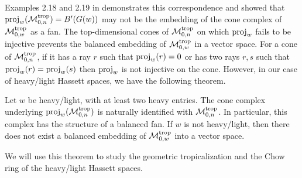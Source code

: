         Examples 2.18 and 2.19 in \citet{Cavalieri2014} demonstrates this correspondence and showed that $\operatorname{proj}_w(\mathcal{M}_{0, n}^{\operatorname{trop}}) = B'(G(w))$ 
        may not be the embedding of the cone complex of $\mathcal{M}_{0, w}^{\operatorname{trop}}$ as a fan. 
        The top-dimensional cones of $\mathcal{M}_{0, n}^{\operatorname{trop}}$ on which $\operatorname{proj}_w$ fails to be injective prevents the balanced embedding of $\mathcal{M}_{0, w}^{\operatorname{trop}}$ in a vector space. 
        For a cone of $\mathcal{M}_{0, n}^{\operatorname{trop}}$,
        if it has a ray $r$ such that $\operatorname{proj}_w(r) = 0$ or has two rays $r, s$ such that $\operatorname{proj}_w(r) = \operatorname{proj}_w(s)$ then $\operatorname{proj}_w$ is not injective on the cone. 
        However, in our case of heavy/light Hassett spaces, we have the following theorem. 
        \begin{theorem}
            Let $w$ be heavy/light, 
            with at least two heavy entries.
            The cone complex underlying $\operatorname{proj}_w(\mathcal{M}_{0, n}^{\operatorname{trop}})$ is naturally identified with $\mathcal{M}_{0, n}^{\operatorname{trop}}$.
            In particular, 
            this complex has the structure of a balanced fan. 
            If $w$ is not heavy/light,
            then there does not exist a balanced embedding of $\mathcal{M}_{0, w}^{\operatorname{trop}}$ into a vector space.
        \end{theorem}
        We will use this theorem to study the geometric tropicalization and the Chow ring of the heavy/light Hassett spaces. 
        
        
        
    

    